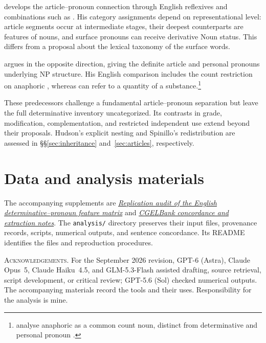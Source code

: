 \documentclass[12pt]{article}
\begin{document}
\textcite{postal1966} develops the article--pronoun connection through English reflexives and combinations such as . His category assignments depend on representational level: article segments occur at intermediate stages, their deepest counterparts are features of nouns, and surface pronouns can receive derivative Noun status. This differs from a proposal about the lexical taxonomy of the surface words.

\textcite[197--203]{sommerstein1972} argues in the opposite direction, giving the definite article and personal pronouns underlying NP structure. His English comparison includes the count restriction on anaphoric , whereas  can refer to a quantity of a substance.\footnote{\textcite[797--798]{payne2013anaphoric} analyse anaphoric  as a common count noun, distinct from determinative  and personal pronoun .}

These predecessors challenge a fundamental article--pronoun separation but leave the full determinative inventory uncategorized. Its contrasts in grade, modification, complementation, and restricted independent use extend beyond their proposals. Hudson's explicit nesting and Spinillo's redistribution are assessed in §§\ref{sec:inheritance} and~\ref{sec:articles}, respectively.

\section*{Data and analysis materials}

The accompanying supplements are \href{run:matrix-audit.pdf}{\textit{Replication audit of the English determinative--pronoun feature matrix}} and \href{run:corpus-documentation.pdf}{\textit{CGELBank concordance and extraction notes}}. The \texttt{analysis/} directory preserves their input files, provenance records, scripts, numerical outputs, and sentence concordance. Its README identifies the files and reproduction procedures.

\vspace{0.5\baselineskip}
\noindent\textsc{Acknowledgements.} For the September 2026 revision, GPT-6 (Astra), Claude Opus~5, Claude Haiku~4.5, and GLM-5.3-Flash assisted drafting, source retrieval, script development, or critical review; GPT-5.6 (Sol) checked numerical outputs. The accompanying materials record the tools and their uses. Responsibility for the analysis is mine.

\clearpage
\printbibliography
\end{document}

